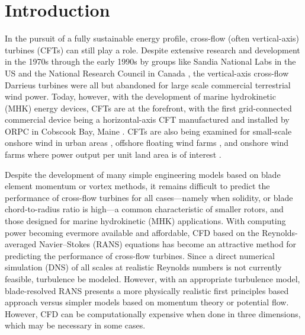 \documentclass[aip,graphicx]{revtex4-1}
\begin{document}
\pacs{}%

\maketitle %

\section{Introduction}

In the pursuit of a fully sustainable energy profile, cross-flow (often
vertical-axis) turbines (CFTs) can still play a role. Despite extensive research
and development in the 1970s through the early 1990s by groups like Sandia
National Labs in the US \cite{Sutherland2012} and the National Research Council
in Canada \cite{Para2002}, the vertical-axis cross-flow Darrieus turbines were
all but abandoned for large scale commercial terrestrial wind power. Today,
however, with the development of marine hydrokinetic (MHK) energy devices, CFTs
are at the forefront, with the first grid-connected commercial device being a
horizontal-axis CFT manufactured and installed by ORPC in Cobscook Bay, Maine
\cite{ORPC2012}. CFTs are also being examined for small-scale onshore wind in
urban areas \cite{Lott2015}, offshore floating wind farms \cite{Paulsen2011,
Sandia2012}, and onshore wind farms where power output per unit land area is of
interest \cite{Dabiri2011}.

Despite the development of many simple engineering models based on blade element
momentum or vortex methods, it remains difficult to predict the performance of
cross-flow turbines for all cases---namely when solidity, or blade
chord-to-radius ratio is high---a common characteristic of smaller rotors, and
those designed for marine hydrokinetic (MHK) applications. With computing power
becoming evermore available and affordable, CFD based on the Reynolds-averaged
Navier--Stokes (RANS) equations has become an attractive method for predicting
the performance of cross-flow turbines. Since a direct numerical simulation
(DNS) of all scales at realistic Reynolds numbers is not currently feasible,
turbulence be modeled. However, with an appropriate turbulence model,
blade-resolved RANS presents a more physically realistic first principles based
approach versus simpler models based on momentum theory or potential flow.
However, CFD can be computationally expensive when done in three dimensions,
which may be necessary in some cases.
\end{document}
